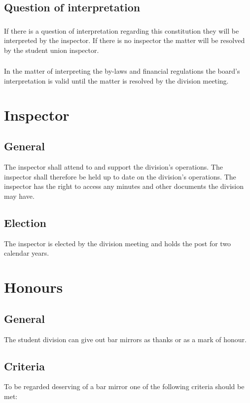 \documentclass[a4paper]{dtek}
\begin{document}
\subsection{Question of interpretation}
\subsubsection{}
If there is a question of interpretation regarding this constitution they will be interpreted by the inspector. If there is no inspector the matter will be resolved by the student union inspector. 

\subsubsection{}
In the matter of interpreting the by-laws and financial regulations the board's interpretation is valid until the matter is resolved by the division meeting. 

\newpage

\section{Inspector}
\subsection{General}
The inspector shall attend to and support the division's operations. The inspector shall therefore be held up to date on the division's operations. The inspector has the right to access any minutes and other documents the division may have.
\subsection{Election}
The inspector is elected by the division meeting and holds the post for two calendar years. 
\newpage

\section{Honours}
\subsection{General}
The student division can give out bar mirrors as thanks or as a mark of honour. 

\subsection{Criteria}
To be regarded deserving of a bar mirror one of the following criteria should be met: 
\end{document}
